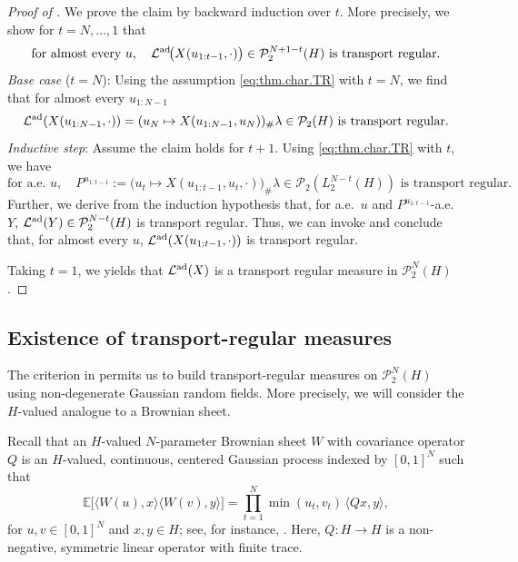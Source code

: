 \documentclass[a4paper]{amsart}
\numberwithin{theorem}{section}
\theoremstyle{definition}
\newcommand{\law}{\mathcal{L}}
\newcommand{\Pc}{\mathcal P}
\renewcommand{\H}{H}
\newcommand{\lawad}{\law^{\textup{ad}}}
\begin{document}
\begin{proof}[Proof of ]
    We prove the claim by backward induction over $t$.
    More precisely, we show for $t = N,\dots,1$ that
    \[
        \text{for almost every $u$},\quad 
        \lawad\!\big(X(u_{1:t-1},\cdot)\big) \in \Pc_2^{N + 1 -t}(\H) 
        \text{ is transport regular.}
    \]
    \emph{Base case} ($t=N$):
    Using the assumption \eqref{eq:thm.char.TR} with $t = N$, we find that for almost every $u_{1:N-1}$ 
    \[
        \lawad(X(u_{1:N-1},\cdot)) 
        = (u_N \mapsto X(u_{1:N-1},u_N))_\# \lambda
        \in \Pc_2(\H)
        \text{ is transport regular}.
    \]
    \emph{Inductive step}:
    Assume the claim holds for $t+1$. 
    Using \eqref{eq:thm.char.TR} with $t$, we have
    \[ 
        \text{for a.e.\ }u, \quad
        P^{u_{1:t-1}} := (u_t \mapsto X(u_{1:t-1},u_t,\cdot) \big)  _\# \lambda 
        \in \mathcal P_2(L^{N-t}_2(\H))
        \text{ is transport regular}.
    \]
    Further, we derive from the induction hypothesis that, for a.e.\ $u$ and $P^{u_{1:t-1}}$-a.e.\ $Y$, $\lawad(Y) \in \Pc_2^{N-t}(\H)$ is transport regular.
    Thus, we can invoke  and conclude that, for almost every $u$, $\lawad(X(u_{1:t-1},\cdot))$ is transport regular.

    Taking $t=1$, we yields that $\lawad(X)$ is a transport regular measure in $\Pc_2^N(\H)$.
\end{proof}


\subsection{Existence of transport-regular measures}

The criterion in  permits us to build transport-regular measures on $\Pc_2^N(H)$ using non-degenerate Gaussian random fields.
More precisely, we will consider the $H$-valued analogue to a Brownian sheet.

Recall that an $H$-valued $N$-parameter Brownian sheet $W$ with covariance operator $Q$ is an $H$-valued, continuous, centered Gaussian process indexed by $[0,1]^N$ such that
\begin{equation}
    \label{eq:}
    \mathbb E\big[ \langle W(u), x \rangle  \langle W(v), y \rangle \big] = \prod_{t = 1}^N \min(u_t,v_t) \, \langle Qx, y\rangle,
\end{equation}
for $u,v \in [0,1]^N$ and $x,y \in H$; see, for instance, \cite[Section~2]{RaSuZe07}.
Here, $Q : H \to H$ is a non-negative, symmetric linear operator with finite trace.
\end{document}
